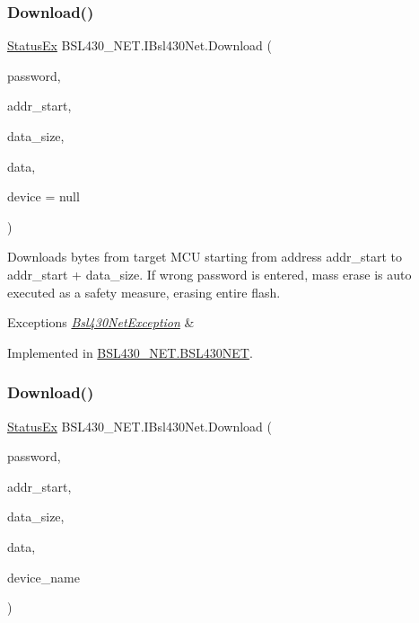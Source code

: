 \subsubsection{\texorpdfstring{Download()}{Download()}\hspace{0.1cm}{\footnotesize\ttfamily [1/2]}}
{\footnotesize\ttfamily \mbox{\hyperlink{class_b_s_l430___n_e_t_1_1_status_ex}{Status\+Ex}} B\+S\+L430\+\_\+\+N\+E\+T.\+I\+Bsl430\+Net.\+Download (\begin{DoxyParamCaption}\item[{byte \mbox{[}$\,$\mbox{]}}]{password,  }\item[{int}]{addr\+\_\+start,  }\item[{int}]{data\+\_\+size,  }\item[{out List$<$ byte $>$}]{data,  }\item[{\mbox{\hyperlink{class_b_s_l430___n_e_t_1_1_bsl430_net_device}{Bsl430\+Net\+Device}}}]{device = {\ttfamily null} }\end{DoxyParamCaption})}



Downloads bytes from target M\+CU starting from address \textquotesingle{}addr\+\_\+start\textquotesingle{} to \textquotesingle{}addr\+\_\+start\textquotesingle{} + \textquotesingle{}data\+\_\+size\textquotesingle{}. If wrong password is entered, mass erase is auto executed as a safety measure, erasing entire flash. 


\begin{DoxyExceptions}{Exceptions}
{\em \mbox{\hyperlink{class_b_s_l430___n_e_t_1_1_bsl430_net_exception}{Bsl430\+Net\+Exception}}} & \\
\hline
\end{DoxyExceptions}


Implemented in \mbox{\hyperlink{class_b_s_l430___n_e_t_1_1_b_s_l430_n_e_t_a76453c32bcc4006f08720bbede236583}{B\+S\+L430\+\_\+\+N\+E\+T.\+B\+S\+L430\+N\+ET}}.

\mbox{\label{interface_b_s_l430___n_e_t_1_1_i_bsl430_net_a416c9d925e98bc5ed00a89e76c4a8501}} 
\subsubsection{\texorpdfstring{Download()}{Download()}\hspace{0.1cm}{\footnotesize\ttfamily [2/2]}}
{\footnotesize\ttfamily \mbox{\hyperlink{class_b_s_l430___n_e_t_1_1_status_ex}{Status\+Ex}} B\+S\+L430\+\_\+\+N\+E\+T.\+I\+Bsl430\+Net.\+Download (\begin{DoxyParamCaption}\item[{byte \mbox{[}$\,$\mbox{]}}]{password,  }\item[{int}]{addr\+\_\+start,  }\item[{int}]{data\+\_\+size,  }\item[{out List$<$ byte $>$}]{data,  }\item[{string}]{device\+\_\+name }\end{DoxyParamCaption})}




